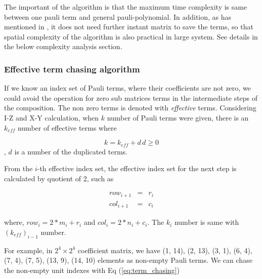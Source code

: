 \documentclass[twocolumn]{article}
\begin{document}
The important of the algorithm is that 
the maximum time complexity is same between one pauli term and general pauli-polynomial.
In addition, as has mentioned in \cite{hantzko_tensorized_2023}, it does not need further 
instant matrix to save the terms, so that spatial complexity of the algorithm is also practical 
in large system.
See details in the below complexity analysis section.

\subsubsection{Effective term chasing algorithm}

If we know an index set of Pauli terms, where their coefficients are not zero,
we could avoid the operation for zero sub matrices terms in the intermediate steps of the composition.
The non zero terms is denoted with \textit{effective} terms. 
Considering I-Z and X-Y calculation, when $k$ number of Pauli terms were given, 
there is an $k_{eff}$ number of effective terms where

\begin{equation}
    k = k_{eff} + d\, d \geq 0
\end{equation}, $d$ is a number of the duplicated terms.

From the $i$-th effective index set, the effective index set for the next step is calculated by
quotient of 2, such as 

\begin{equation}
    \label{eq:term_chasing}
    \begin{array}{ccc}
        row_{i+1}&=& r_i \\
        col_{i+1}&=& c_i
    \end{array}
\end{equation}

where, $row_i = 2*m_i + r_i$ and $col_i = 2*n_i + c_i$.
The $k_i$ number is same with $(k_{eff})_{i-1}$ number. 

For example, in $2^4 \times 2^4$ coefficient matrix, 
we have 
(1, 14), 
(2, 13), 
(3, 1), 
(6, 4),
(7, 4),
(7, 5),
(13, 9),
(14, 10) elements as non-empty Pauli terms. 
We can chase the non-empty unit indexes with Eq (\ref{eq:term_chasing})
\end{document}
